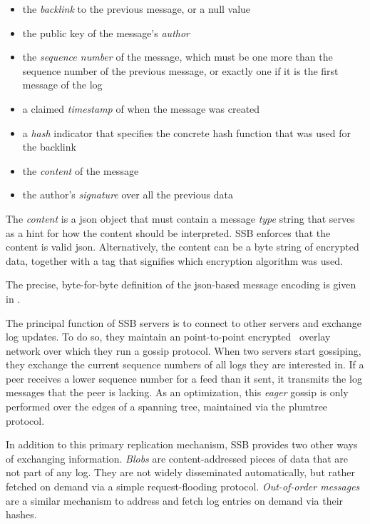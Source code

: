 \documentclass[sigconf]{acmart}
\begin{document}
\begin{itemize}

\item the {\em backlink} to the previous message, or a null value

\item the public key of the message's {\em author}

\item the {\em sequence number} of the message, which must be one more than the sequence number of the previous message, or exactly one if it is the first message of the log

\item a claimed {\em timestamp} of when the message was created

\item a {\em hash} indicator that specifies the concrete hash function that was used for the backlink

\item the {\em content} of the message

\item the author's {\em signature} over all the previous data

\end{itemize}

The {\em content} is a json object that must contain a message {\em type} string that serves as a hint for how the content should be interpreted. SSB enforces that the content is valid json.
Alternatively, the content can be a byte string of encrypted data, together with a tag that signifies which encryption algorithm was used.

The precise, byte-for-byte definition of the json-based message encoding is given in \cite{ssb-spec-messages}.

The principal function of SSB servers is to connect to other servers and exchange log updates. To do so, they maintain an point-to-point encrypted~\cite{tarr2015secrethandshake} overlay network over which they run a gossip protocol. When two servers start gossiping, they exchange the current sequence numbers of all logs they are interested in. If a peer receives a lower sequence number for a feed than it sent, it transmits the log messages that the peer is lacking. As an optimization, this {\em eager} gossip is only performed over the edges of a spanning tree, maintained via the plumtree~\cite{leitao2007epidemic} protocol.

In addition to this primary replication mechanism, SSB provides two other ways of exchanging information. {\em Blobs} are content-addressed pieces of data that are not part of any log. They are not widely disseminated automatically, but rather fetched on demand via a simple request-flooding protocol. {\em Out-of-order messages} are a similar mechanism to address and fetch log entries on demand via their hashes.
\end{document}
